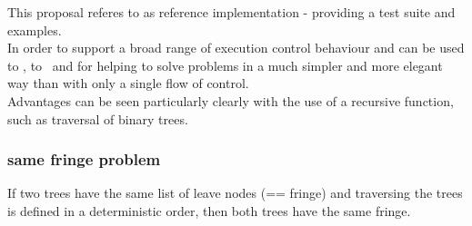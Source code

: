 
This proposal referes to \boostcoroutine as reference implementation - providing
a test suite and examples.\\
\newline
In order to support a broad range of execution control behaviour \pushcoro and
\pullcoro can be used to \escrecloops, to \escreccomps~and for \coopmultitasking
helping to solve problems in a much simpler and more elegant way than with only
a single flow of control.\\ Advantages can be seen particularly clearly with the use of a recursive
function, such as traversal of binary trees.

\subsubsection*{same fringe problem}

If two trees have the same list of leave nodes (== fringe) and traversing the
trees is defined in a deterministic order, then both trees have the same fringe.\\


